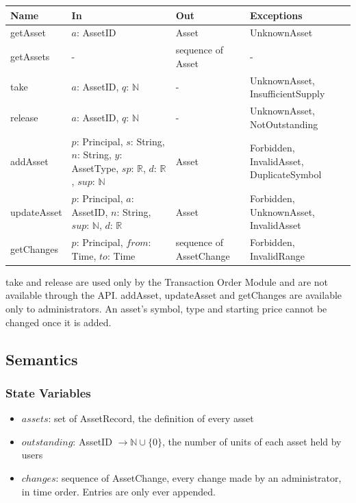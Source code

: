 \documentclass[12pt, titlepage]{article}
\begin{document}
\begin{center}
\renewcommand{\arraystretch}{1.2}
\begin{tabular}{>{\raggedright\arraybackslash}p{2.4cm}
  >{\raggedright\arraybackslash}p{5cm}
  >{\raggedright\arraybackslash}p{2.6cm}
  >{\raggedright\arraybackslash}p{4cm}}
\toprule
\textbf{Name} & \textbf{In} & \textbf{Out} & \textbf{Exceptions} \\
\midrule
getAsset & $a$: AssetID & Asset & UnknownAsset \\
getAssets & - & sequence of Asset & - \\
take & $a$: AssetID, $q$: $\mathbb{N}$ & - & UnknownAsset,
  InsufficientSupply \\
release & $a$: AssetID, $q$: $\mathbb{N}$ & - & UnknownAsset,
  NotOutstanding \\
addAsset & $p$: Principal, $s$: String, $n$: String, $y$: AssetType,
  $\mathit{sp}$: $\mathbb{R}$, $d$: $\mathbb{R}$, $\mathit{sup}$:
  $\mathbb{N}$ & Asset & Forbidden, InvalidAsset, DuplicateSymbol \\
updateAsset & $p$: Principal, $a$: AssetID, $n$: String, $\mathit{sup}$:
  $\mathbb{N}$, $d$: $\mathbb{R}$ & Asset & Forbidden, UnknownAsset,
  InvalidAsset \\
getChanges & $p$: Principal, $\mathit{from}$: Time, $\mathit{to}$: Time &
  sequence of AssetChange & Forbidden, InvalidRange \\
\bottomrule
\end{tabular}
\end{center}

\noindent take and release are used only by the Transaction Order Module and
are not available through the API. addAsset, updateAsset and getChanges are
available only to administrators. An asset's symbol, type and starting
price cannot be changed once it is added.

\subsection{Semantics}

\subsubsection{State Variables}

\begin{itemize}
\item $\mathit{assets}$: set of AssetRecord, the definition of every asset
\item $\mathit{outstanding}$: AssetID $\rightarrow \mathbb{N} \cup \{0\}$,
  the number of units of each asset held by users
\item $\mathit{changes}$: sequence of AssetChange, every change made by an
  administrator, in time order. Entries are only ever appended.
\end{itemize}
\end{document}
